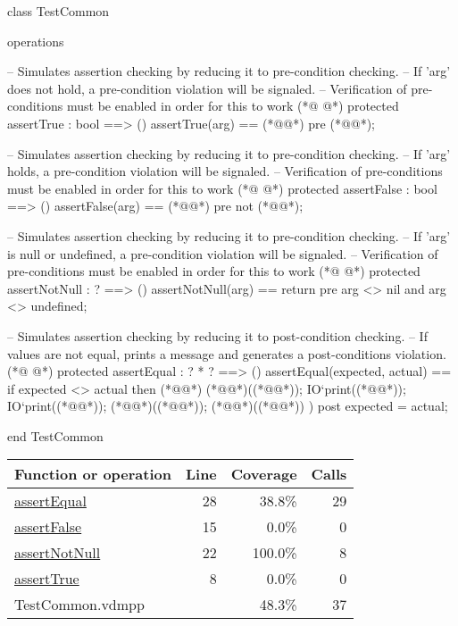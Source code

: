 \begin{vdmpp}[breaklines=true]
class TestCommon

operations

  -- Simulates assertion checking by reducing it to pre-condition checking.
  -- If 'arg' does not hold, a pre-condition violation will be signaled.
  -- Verification of pre-conditions must be enabled in order for this to work
(*@
\label{assertTrue:8}
@*)
  protected assertTrue : bool ==> ()
  assertTrue(arg) == (*@@*)
  pre (*@@*);

  -- Simulates assertion checking by reducing it to pre-condition checking.
  -- If 'arg' holds, a pre-condition violation will be signaled.
  -- Verification of pre-conditions must be enabled in order for this to work
(*@
\label{assertFalse:15}
@*)
  protected assertFalse : bool ==> ()
  assertFalse(arg) == (*@@*)
  pre not (*@@*);

  -- Simulates assertion checking by reducing it to pre-condition checking.
  -- If 'arg' is null or undefined, a pre-condition violation will be signaled.
  -- Verification of pre-conditions must be enabled in order for this to work
(*@
\label{assertNotNull:22}
@*)
  protected assertNotNull : ? ==> ()
  assertNotNull(arg) == return
  pre arg <> nil and arg <> undefined;

  -- Simulates assertion checking by reducing it to post-condition checking.
  -- If values are not equal, prints a message and generates a post-conditions violation.
(*@
\label{assertEqual:28}
@*)
  protected assertEqual : ? * ? ==> ()
  assertEqual(expected, actual) ==
    if expected <> actual then
    (*@\vdmnotcovered{(}@*)
      (*@@*)((*@@*));
      IO`print((*@@*));
      IO`print((*@@*));
      (*@@*)((*@@*));
      (*@@*)((*@@*))
    )
  post expected = actual;

end TestCommon
\end{vdmpp}
\bigskip
\begin{longtable}{|l|r|r|r|}
\hline
Function or operation & Line & Coverage & Calls \\
\hline
\hline
\hyperref[assertEqual:28]{assertEqual} & 28&38.8\% & 29 \\
\hline
\hyperref[assertFalse:15]{assertFalse} & 15&0.0\% & 0 \\
\hline
\hyperref[assertNotNull:22]{assertNotNull} & 22&100.0\% & 8 \\
\hline
\hyperref[assertTrue:8]{assertTrue} & 8&0.0\% & 0 \\
\hline
\hline
TestCommon.vdmpp & & 48.3\% & 37 \\
\hline
\end{longtable}

